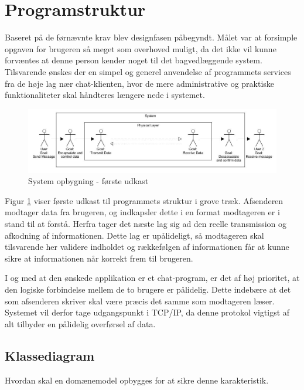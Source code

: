

\section{Programstruktur}
Baseret på de førnævnte krav blev designfasen påbegyndt. Målet var at forsimple opgaven for brugeren så meget som overhoved muligt, da det ikke vil kunne forvæntes at denne person kender noget til det bagvedlæggende system. 
Tilsvarende ønskes der en simpel og generel anvendelse af programmets services fra de høje lag nær chat-klienten, hvor de mere administrative og praktiske funktionaliteter skal håndteres længere nede i systemet.

\begin{figure}[h]
\centering
\includegraphics[scale=0.5]{Billeder/ProgramOpbygning1.JPG}
\caption{System opbygning - første udkast}
\label{fig:Blokdiagram}
\end{figure}

Figur \ref{fig:Blokdiagram} viser første udkast til programmets struktur i grove træk. Afsenderen modtager data fra brugeren, og indkapsler dette i en format modtageren er i stand til at forstå. Herfra tager det næste lag sig ad den reelle transmission og afkodning af informationen. Dette lag er upålideligt, så modtageren skal tilsvarende her validere indholdet og rækkefølgen af informationen får at kunne sikre at informationen når korrekt frem til brugeren. 

I og med at den ønskede applikation er et chat-program, er det af høj prioritet, at den logiske forbindelse mellem de to brugere er pålidelig. Dette indebære at det som afsenderen skriver skal være præcis det samme som modtageren læser. Systemet vil derfor tage udgangspunkt i TCP/IP, da denne protokol vigtigst af alt tilbyder en pålidelig overførsel af data. 




\subsection{Klassediagram}
Hvordan skal en domænemodel opbygges for at sikre denne karakteristik. 

